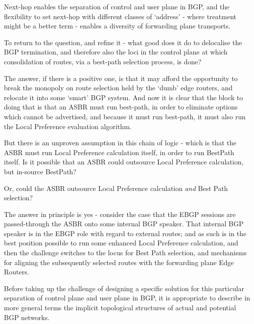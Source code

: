 \medskip
Next-hop enables the separation of control and user plane in BGP, and the flexibility to set next-hop with different classes of `address' - where treatment might be a better term - enables a diversity of forwarding plane transports.

\bigskip

To return to the question, and refine it - what good does it do to delocalise the BGP termination, and therefore also the loci in the  control plane at which consolidation of routes, via a best-path selection process, is done?

The answer, if there is a positive one, is that it may afford the opportunity to break the monopoly on route selection held by the `dumb' edge routers, and relocate it into some `smart' BGP system.  And now it is clear that the block to doing that is that an ASBR must run best-path, in order to eliminate options which cannot be advertised, and because it must run best-path, it must also run the Local Preference evaluation algorithm.

But there is an unproven assumption in this chain of logic - which is that the ASBR must run Local Preference calculation itself, in order to run BestPath itself.  Is it possible that an ASBR could outsource Local Preference calculation, but in-source BestPath?

Or, could the ASBR outsource Local Preference calculation \textit{and} Best Path selection?

The answer in principle is yes - consider the case that the EBGP sessions are passed-through the ASBR onto some internal BGP speaker.  That internal BGP speaker is in the EBGP role with regard to external routes; and as such is in the best position possible to run some enhanced Local Preference calculation, and then the challenge switches to the locus for Best Path selection, and mechanisms for aligning the subsequently selected routes with the forwarding plane Edge Routers.

\medskip

Before taking up the challenge of designing a specific solution for this particular separation of control plane and user plane in BGP, it is appropriate to describe in more general terms the implicit topological structures of actual and potential BGP networks.

